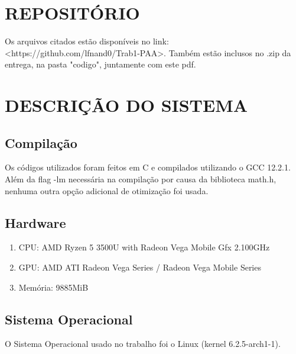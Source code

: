 \section{\esp REPOSITÓRIO}

Os arquivos citados estão disponíveis no link: <https://github.com/lfnand0/Trab1-PAA>. Também estão inclusos no .zip da entrega, na pasta "codigo", juntamente com este pdf.

\section{\esp DESCRIÇÃO DO SISTEMA}

\subsection{\esp Compilação}
Os códigos utilizados foram feitos em C e compilados utilizando o GCC 12.2.1. Além da flag -lm necessária na compilação por causa da biblioteca math.h, nenhuma outra opção adicional de otimização foi usada. 

\subsection{\esp Hardware}
\begin{enumerate} 
\item []CPU: AMD Ryzen 5 3500U with Radeon Vega Mobile Gfx 2.100GHz
\item []GPU: AMD ATI Radeon Vega Series / Radeon Vega Mobile Series
\item []Memória: 9885MiB
\end{enumerate}

\subsection{\esp Sistema Operacional}
O Sistema Operacional usado no trabalho foi o Linux (kernel 6.2.5-arch1-1).

